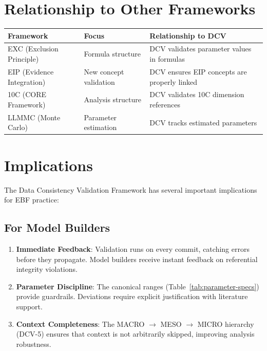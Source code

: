 \section{Relationship to Other Frameworks}
\label{sec:vc-relationship}

\begin{center}
\begin{tabular}{lll}
\toprule
\textbf{Framework} & \textbf{Focus} & \textbf{Relationship to DCV} \\
\midrule
EXC (Exclusion Principle) & Formula structure & DCV validates parameter values in formulas \\
EIP (Evidence Integration) & New concept validation & DCV ensures EIP concepts are properly linked \\
10C (CORE Framework) & Analysis structure & DCV validates 10C dimension references \\
LLMMC (Monte Carlo) & Parameter estimation & DCV tracks estimated parameters \\
\bottomrule
\end{tabular}
\end{center}

\section{Implications}
\label{sec:vc-implications}

The Data Consistency Validation Framework has several important implications for EBF practice:

\subsection{For Model Builders}

\begin{enumerate}
    \item \textbf{Immediate Feedback}: Validation runs on every commit, catching errors before they propagate. Model builders receive instant feedback on referential integrity violations.

    \item \textbf{Parameter Discipline}: The canonical ranges (Table~\ref{tab:parameter-specs}) provide guardrails. Deviations require explicit justification with literature support.

    \item \textbf{Context Completeness}: The MACRO $\to$ MESO $\to$ MICRO hierarchy (DCV-5) ensures that context is not arbitrarily skipped, improving analysis robustness.
\end{enumerate}

